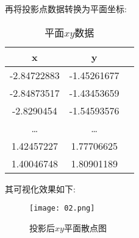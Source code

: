 再将投影点数据转换为平面坐标:
\begin{table}[!htbp]
    \centering
    \begin{tabular}{ccc} \hline
        x & y \\ \hline
        -2.84722883 & -1.45261677 \\
        -2.84873517 & -1.43453659 \\
        -2.8290454 & -1.54593576 \\
        \ldots & \ldots \\
        1.42457227 & 1.77706625 \\
        1.40046748 & 1.80901189 \\ \hline
    \end{tabular}
    \caption{平面$xy$数据}
\end{table}

其可视化效果如下:
\begin{figure}[!htbp]
    \centering
    \texttt{[image: 02.png]}
    \caption{投影后$xy$平面散点图}
\end{figure}